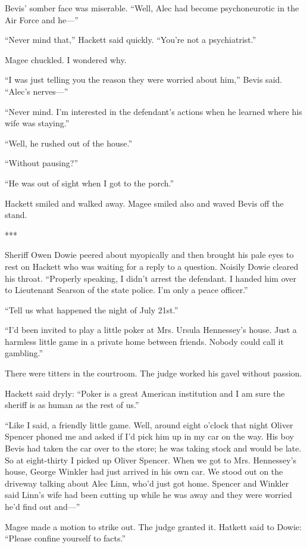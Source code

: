 \documentclass{novel}
\begin{document}
{Bevis’ somber face was miserable. “Well, Alec had become psychoneurotic in the Air Force and he—”

“Never mind that,” Hackett said quickly. “You’re not a psychiatrist.”

Magee chuckled. I wondered why.

“I was just telling you the reason they were worried about him,” Bevis said. “Alec’s nerves—”

“Never mind. I’m interested in the defendant’s actions when he learned where his wife was staying.”

“Well, he rushed out of the house.”

“Without pausing?”

“He was out of sight when I got to the porch.”

Hackett smiled and walked away. Magee smiled also and waved Bevis off the stand.

***

Sheriff Owen Dowie peered about myopically and then brought his pale eyes to rest on Hackett who was waiting for a reply to a question. Noisily Dowie cleared his throat. “Properly speaking, I didn’t arrest the defendant. I handed him over to Lieutenant Searson of the state police. I’m only a peace officer.”

“Tell us what happened the night of July 21st.”

“I’d been invited to play a little poker at Mrs. Ursula Hennessey’s house. Just a harmless little game in a private home between friends. Nobody could call it gambling.”

There were titters in the courtroom. The judge worked his gavel without passion.

Hackett said dryly: “Poker is a great American institution and I am sure the sheriff is as human as the rest of us.”

“Like I said, a friendly little game. Well, around eight o’clock that night Oliver Spencer phoned me and asked if I’d pick him up in my car on the way. His boy Bevis had taken the car over to the store; he was taking stock and would be late. So at eight-thirty I picked up Oliver Spencer. When we got to Mrs. Hennessey’s house, George Winkler had just arrived in his own car. We stood out on the driveway talking about Alec Linn, who’d just got home. Spencer and Winkler said Linn’s wife had been cutting up while he was away and they were worried he’d find out and—”

Magee made a motion to strike out. The judge granted it. Hatkett said to Dowie: “Please confine yourself to facts.”

}
\end{document}
